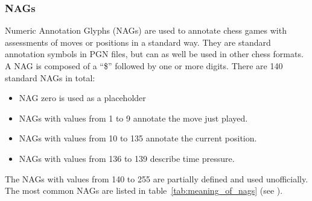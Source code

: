 \documentclass[article,type=msc,colorback,accentcolor=tud7b]{tudthesis}
\begin{document}
  \subsubsection{NAGs}
  \label{subsec:nags}
    Numeric Annotation Glyphs (NAGs) are used to annotate chess games with assessments of moves or positions in a standard way. They are standard annotation symbols in PGN files, but can as well be used in other chess formats. A NAG is composed of a “\$” followed by one or more digits. There are 140 standard NAGs in total:
    \begin{itemize}[noitemsep]
      \item NAG zero is used as a placeholder
      \item NAGs with values from 1 to 9 annotate the move just played.
      \item NAGs with values from 10 to 135 annotate the current position.
      \item NAGs with values from 136 to 139 describe time pressure.
    \end{itemize}
    The NAGs with values from 140 to 255 are partially defined and used unofficially. The most common NAGs are listed in table~\ref{tab:meaning_of_nags} (see \autocite[chapter~10]{Edwards1994}).
	
\end{document}
